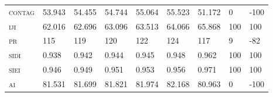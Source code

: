 \begin{landscape}
\begin{table}[!htbp]
\begin{tabular}{@{}llllll|lll@{}}
\small \textsc{contag}           & 53.943   & 54.455   & 54.744   & 55.064   & 55.523     & 51.172        & 0        & -100 \\
\small \textsc{iji }             & 62.016   & 62.696   & 63.096   & 63.513   & 64.066     & 65.868        & 100      & 100  \\
\small \textsc{pr}               & 115      & 119      & 120      & 122      & 124        & 117           & 9        & -82  \\
\small \textsc{sidi}             & 0.938    & 0.942    & 0.944    & 0.945    & 0.948      & 0.962         & 100      & 100  \\
\small \textsc{siei}             & 0.946    & 0.949    & 0.951    & 0.953    & 0.956      & 0.971         & 100      & 100  \\
\small \textsc{ai}               & 81.531   & 81.699   & 81.821   & 81.974   & 82.168     & 80.963        & 0        & -100 \\ \bottomrule
\end{tabular}
\end{table}
\end{landscape}
